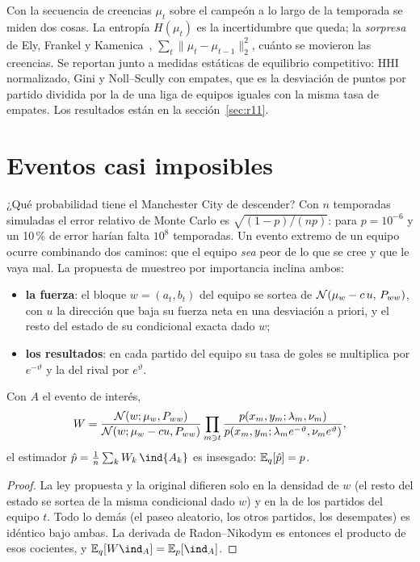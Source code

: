 Con la secuencia de creencias $\mu_t$ sobre el campeón a lo largo de la temporada se miden dos cosas. La entropía $H(\mu_t)$ es la incertidumbre que queda; la \emph{sorpresa} de Ely, Frankel y Kamenica~\cite{ely2015}, $\sum_t\|\mu_t-\mu_{t-1}\|_2^2$, cuánto se movieron las creencias. Se reportan junto a medidas estáticas de equilibrio competitivo: HHI normalizado, Gini y Noll–Scully con empates, que es la desviación de puntos por partido dividida por la de una liga de equipos iguales con la misma tasa de empates. Los resultados están en la sección~\ref{sec:r11}.

\section{Eventos casi imposibles}
\label{sec:raros}

¿Qué probabilidad tiene el Manchester City de descender? Con $n$ temporadas simuladas el error relativo de Monte Carlo es $\sqrt{(1-p)/(np)}$: para $p=10^{-6}$ y un 10\,\% de error harían falta $10^8$ temporadas. Un evento extremo de un equipo ocurre combinando dos caminos: que el equipo \emph{sea} peor de lo que se cree y que le vaya mal. La propuesta de muestreo por importancia inclina ambos:
\begin{itemize}
\item \textbf{la fuerza}: el bloque $w=(a_t,b_t)$ del equipo se sortea de $\mathcal{N}(\mu_w-c\,u,\,P_{ww})$, con $u$ la dirección que baja su fuerza neta en una desviación a priori, y el resto del estado de su condicional exacta dado $w$;
\item \textbf{los resultados}: en cada partido del equipo su tasa de goles se multiplica por $e^{-\vartheta}$ y la del rival por $e^{\vartheta}$.
\end{itemize}

\begin{proposicion} \dem
Con $A$ el evento de interés,
\[
W=\frac{\mathcal{N}(w;\mu_w,P_{ww})}{\mathcal{N}(w;\mu_w-cu,P_{ww})}\prod_{m\ni t}\frac{p(x_m,y_m;\lambda_m,\nu_m)}{p(x_m,y_m;\lambda_me^{-\vartheta},\nu_me^{\vartheta})},
\]
el estimador $\hat p=\tfrac1n\sum_kW_k\,\ind\{A_k\}$ es insesgado: $\mathbb{E}_q[\hat p]=p$.
\end{proposicion}

\begin{proof}
La ley propuesta y la original difieren solo en la densidad de $w$ (el resto del estado se sortea de la misma condicional dado $w$) y en la de los partidos del equipo $t$. Todo lo demás (el paseo aleatorio, los otros partidos, los desempates) es idéntico bajo ambas. La derivada de Radon–Nikodym es entonces el producto de esos cocientes, y $\E_q[W\ind_A]=\E_p[\ind_A]$.
\end{proof}

